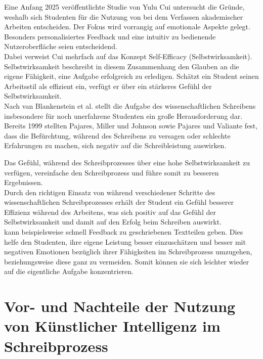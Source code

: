 \documentclass[../main.tex]{subfiles}
\begin{document}
Eine Anfang 2025 veröffentlichte Studie von Yulu Cui untersucht die Gründe, weshalb sich Studenten für die Nutzung von 
 bei dem Verfassen akademischer Arbeiten entscheiden. Der Fokus wird vorrangig auf emotionale 
Aspekte gelegt. Besonders personalisiertes Feedback und eine intuitiv zu bedienende Nutzeroberfläche seien entscheidend.\cite{influencingUsingAi} \\
Dabei verweist Cui mehrfach auf das Konzept Self-Efficacy (Selbstwirksamkeit). Selbstwirksamkeit beschreibt in diesem Zusammenhang den Glauben 
an die eigene Fähigkeit, eine Aufgabe erfolgreich zu erledigen. Schätzt ein Student seinen Arbeitsstil als effizient ein, 
verfügt er über ein stärkeres Gefühl der Selbstwirksamkeit.\cite{influencingUsingAi,SelfEfficacyBeliefs}\\
Nach van Blankenstein et al. stellt die Aufgabe des wissenschaftlichen Schreibens insbesondere für noch unerfahrene Studenten 
ein große Herausforderung dar. Bereits 1999 stellten Pajares, Miller und Johnson sowie Pajares und Valiante fest,
dass die Befürchtung, während des Schreibens zu versagen oder schlechte Erfahrungen zu machen, sich negativ auf die Schreibleistung 
auswirken.\cite{writingSelfBeliefs,writingSelfBeliefsMiddleSchool}

Das Gefühl, während des Schreibprozesses über eine hohe Selbstwirksamkeit zu verfügen, vereinfache den 
Schreibprozess und führe somit zu besseren Ergebnissen.\cite{SelfEfficacyBeliefs} \\
Durch den richtigen Einsatz von  während verschiedener Schritte des wissenschaftlichen Schreibprozesses erhält der Student
ein Gefühl besserer Effizienz während des Arbeitens, was sich positiv auf das Gefühl der Selbstwirksamkeit und damit auf den Erfolg
beim Schreiben auswirkt.\\
 kann beispielsweise schnell Feedback zu geschriebenen Textteilen geben. Dies helfe den Studenten, ihre eigene 
Leistung besser einzuschätzen und besser mit negativen Emotionen bezüglich ihrer Fähigkeiten im Schreibprozess umzugehen, beziehungsweise diese ganz zu vermeiden. Somit 
können sie sich leichter wieder auf die eigentliche Aufgabe konzentrieren.\cite{SelfEfficacyBeliefs} 



\section{Vor- und Nachteile der Nutzung von Künstlicher Intelligenz im Schreibprozess}
\end{document}
